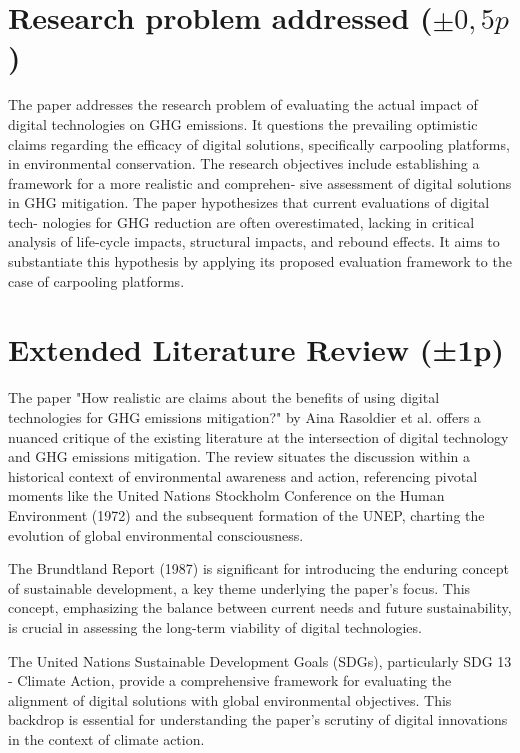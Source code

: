 \documentclass[conference,compsoc]{IEEEtran}
\begin{document}
\section{Research problem addressed ($\pm 0,5p$)}

The paper addresses the research problem of evaluating
the actual impact of digital technologies on GHG emissions.
It questions the prevailing optimistic claims regarding the
efficacy of digital solutions, specifically carpooling platforms,
in environmental conservation. The research objectives include
establishing a framework for a more realistic and comprehen-
sive assessment of digital solutions in GHG mitigation. The
paper hypothesizes that current evaluations of digital tech-
nologies for GHG reduction are often overestimated, lacking
in critical analysis of life-cycle impacts, structural impacts,
and rebound effects. It aims to substantiate this hypothesis
by applying its proposed evaluation framework to the case of
carpooling platforms.


\section{Extended Literature Review (±1p)}

The paper "How realistic are claims about the benefits of using digital technologies for GHG emissions mitigation?" by Aina Rasoldier et al. offers a nuanced critique of the existing literature at the intersection of digital technology and GHG emissions mitigation. The review situates the discussion within a historical context of environmental awareness and action, referencing pivotal moments like the United Nations Stockholm Conference on the Human Environment (1972) and the subsequent formation of the UNEP, charting the evolution of global environmental consciousness.

The Brundtland Report (1987) is significant for introducing the enduring concept of sustainable development, a key theme underlying the paper's focus. This concept, emphasizing the balance between current needs and future sustainability, is crucial in assessing the long-term viability of digital technologies.

The United Nations Sustainable Development Goals (SDGs), particularly SDG 13 - Climate Action, provide a comprehensive framework for evaluating the alignment of digital solutions with global environmental objectives. This backdrop is essential for understanding the paper’s scrutiny of digital innovations in the context of climate action.
\end{document}
